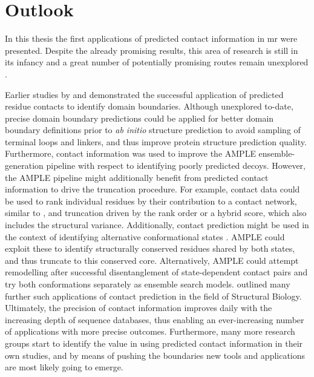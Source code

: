 \section{Outlook}
In this thesis the first applications of predicted contact information in \gls{mr} were presented. Despite the already promising results, this area of research is still in its infancy and a great number of potentially promising routes remain unexplored \cite{Simkovic2017-xs}. 

Earlier studies by \textcite{Rigden2002-mf} and \textcite{Sadowski2013-zu} demonstrated the successful application of predicted residue contacts to identify domain boundaries. Although unexplored to-date, precise domain boundary predictions could be applied for better domain boundary definitions prior to \textit{ab initio} structure prediction to avoid sampling of terminal loops and linkers, and thus improve protein structure prediction quality. Furthermore, contact information was used to improve the AMPLE ensemble-generation pipeline with respect to identifying poorly predicted decoys. However, the AMPLE pipeline might additionally benefit from predicted contact information to drive the truncation procedure. For example, contact data could be used to rank individual residues by their contribution to a contact network, similar to \textcite{Parente2015-mv}, and truncation driven by the rank order or a hybrid score, which also includes the structural variance. Additionally, contact prediction might be used in the context of identifying alternative conformational states \cite{Hopf2012-zl,Jana2014-rw,Sfriso2016-ml,Morcos2013-ks,Sutto2015-ck}. AMPLE could exploit these to identify structurally conserved residues shared by both states, and thus truncate to this conserved core. Alternatively, AMPLE could attempt remodelling after successful disentanglement of state-dependent contact pairs and try both conformations separately as ensemble search models. \textcite{Simkovic2017-xs} outlined many further such applications of contact prediction in the field of Structural Biology. Ultimately, the precision of contact information improves daily with the increasing depth of sequence databases, thus enabling an ever-increasing number of applications with more precise outcomes. Furthermore, many more research groups start to identify the value in using predicted contact information in their own studies, and by means of pushing the boundaries new tools and applications are most likely going to emerge. 

